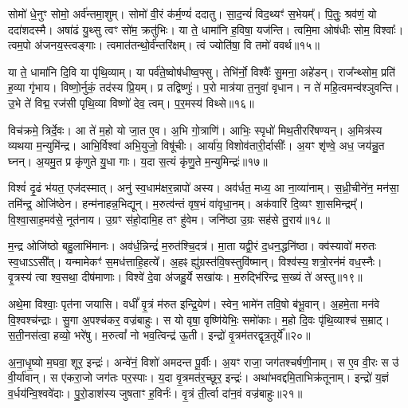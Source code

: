 सोमो॑ धे॒नुꣳ सोमो॒ अर्व॑न्तमा॒शुम्।
सोमो॑ वी॒रं क॑र्म॒ण्यं॑ ददातु।
सा॒द॒न्यं॑ विद॒थ्यꣳ॑ स॒भेयम्᳚।
पि॒तुः॒ श्रव॑णं॒ यो ददा॑शदस्मै।
अषा॑ढं यु॒थ्सु त्वꣳ सो॑म॒ क्रतु॑भिः।
या ते॒ धामा॑नि ह॒विषा॒ यज॑न्ति।
त्वमि॒मा ओष॑धीः सोम॒ विश्वाः᳚।
त्वम॒पो अ॑जनय॒स्त्वङ्गाः।
त्वमात॑तन्थो॒र्व॑न्तरि॑क्षम्।
त्वं ज्योति॑षा॒ वि तमो॑ ववर्थ॥१५॥\ip

या ते॒ धामा॑नि दि॒वि या पृ॑थि॒व्याम्।
या पर्व॑ते॒ष्वोष॑धीष्व॒फ्सु।
तेभि॑र्नो॒ विश्वैः᳚ सु॒मना॒ अहे॑डन्।
राज᳚न्थ्सोम॒ प्रति॑ ह॒व्या गृ॑भाय।
विष्णो॒र्नुकं॒ तद॑स्य प्रि॒यम्।
प्र तद्विष्णुः॑।
प॒रो मात्र॑या त॒नुवा॑ वृधान।
न ते॑ महि॒त्वमन्व॑श्ञुवन्ति।
उ॒भे ते॑ विद्म॒ रज॑सी पृथि॒व्या विष्णो॑ देव॒ त्वम्।
प॒र॒मस्य॑ विथ्से॥१६॥\ip

विच॑क्रमे॒ त्रिर्दे॒वः।
आ ते॑ म॒हो यो जा॒त ए॒व।
अ॒भि गो॒त्राणि॑।
आभिः॒ स्पृधो॑ मिथ॒तीररि॑षण्यन्।
अ॒मित्र॑स्य व्यथया म॒न्युमि॑न्द्र।
आभि॒र्विश्वा॑ अभि॒युजो॒ विषू॑चीः।
आर्या॑य॒ विशोव॑तारी॒र्दासीः᳚।
अ॒यꣳ शृ॑ण्वे॒ अध॒ जय॑न्नु॒त घ्नन्।
अ॒यमु॒त प्र कृ॑णुते यु॒धा गाः।
य॒दा स॒त्यं कृ॑णु॒ते म॒न्युमिन्द्रः॑॥१७॥\ip

विश्वं॑ दृ॒ढं भ॑यत॒ एज॑दस्मात्।
अनु॑ स्व॒धाम॑क्षर॒न्नापो॑ अस्य।
अव॑र्धत॒ मध्य॒ आ ना॒व्या॑नाम्।
स॒ध्री॒चीने॑न॒ मन॑सा॒ तमि॑न्द्र॒ ओजि॑ष्ठेन।
हन्म॑नाहन्न॒भिद्यून्।
म॒रुत्व॑न्तं वृष॒भं वा॑वृधा॒नम्।
अक॑वारिं दि॒व्यꣳ शा॒समिन्द्रम्᳚।
वि॒श्वा॒साह॒मव॑से॒ नूत॑नाय।
उ॒ग्रꣳ स॑हो॒दामि॒ह तꣳ हु॑वेम।
जनि॑ष्ठा उ॒ग्रः सह॑से तु॒राय॑॥१८॥\ip

म॒न्द्र ओजि॑ष्ठो बहु॒लाभि॑मानः।
अव॑र्ध॒न्निन्द्रं॑ म॒रुत॑श्चि॒दत्र॑।
मा॒ता यद्वी॒रं द॒धन॒द्धनि॑ष्ठा।
क्व॑स्यावो॑ मरुतः स्व॒धा\-ऽऽसी᳚त्।
यन्मामेकꣳ॑ स॒मध॑त्ताहि॒हत्ये᳚।
अ॒हꣴ ह्यु॑ग्रस्त॑वि॒षस्तुवि॑ष्मान्।
विश्व॑स्य॒ शत्रो॒रन॑मं वध॒स्नैः।
वृ॒त्रस्य॑ त्वा श्व॒सथा॒ दीष॑माणाः।
विश्वे॑ दे॒वा अ॑जहु॒र्ये सखा॑यः।
म॒रुद्भि॑रिन्द्र स॒ख्यं ते॑ अस्तु॥१९॥\ip

अथे॒मा विश्वाः॒ पृत॑ना जयासि।
वधीं᳚ वृ॒त्रं म॑रुत इन्द्रि॒येण॑।
स्वेन॒ भामे॑न तवि॒षो ब॑भू॒वान्।
अ॒हमे॒ता मन॑वे वि॒श्वश्च॑न्द्राः।
सु॒गा अ॒पश्च॑कर॒ वज्र॑बाहुः।
स यो वृषा॒ वृष्णि॑येभिः॒ समो॑काः।
म॒हो दि॒वः पृ॑थि॒व्याश्च॑ स॒म्राट्।
स॒ती॒नस॑त्वा॒ हव्यो॒ भरे॑षु।
म॒रुत्वां᳚ नो भव॒त्विन्द्र॑ ऊ॒ती।
इन्द्रो॑ वृ॒त्रम॑तरद्वृत्र॒तूर्ये᳚॥२०॥\ip

अ॒ना॒धृ॒ष्यो म॒घवा॒ शूर॒ इन्द्रः॑।
अन्वे॑नं॒ विशो॑ अमदन्त पू॒र्वीः।
अ॒यꣳ राजा॒ जग॑तश्चर्\mbox{}षणी॒नाम्।
स ए॒व वी॒रः स उ॑ वी॒र्या॑वान्।
स ए॑करा॒जो जग॑तः पर॒स्पाः।
य॒दा वृ॒त्रमत॑र॒च्छूर॒ इन्द्रः॑।
अथा॑भवद्दमि॒ताभिक्र॑तूनाम्।
इन्द्रो॑ य॒ज्ञं व॒र्धय॑न्वि॒श्ववे॑दाः।
पु॒रो॒डाश॑स्य जुषताꣳ ह॒विर्नः॑।
वृ॒त्रं ती॒र्त्वा दा॑न॒वं वज्र॑बाहुः॥२१॥\ip

